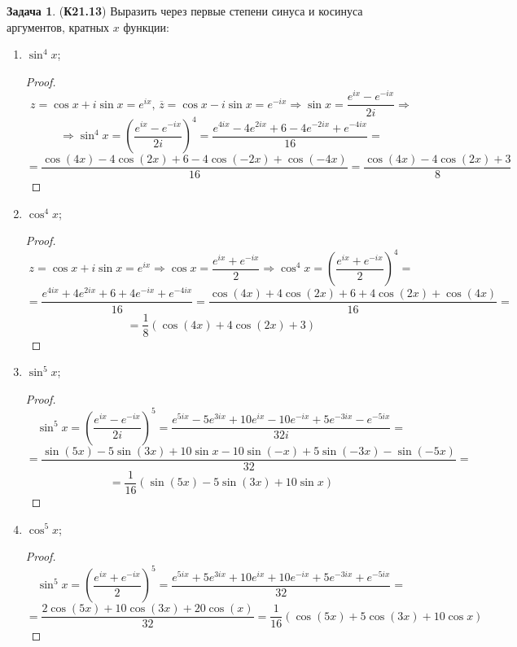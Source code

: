 \documentclass[12pt]{article}
\theoremstyle{definition}
\newtheorem{problem}{Задача}
\newcommand{\ovl}[1]{\overline{#1}}
\begin{document}
\begin{problem}(\textbf{К21.13})
	Выразить через первые степени синуса и косинуса аргументов, кратных $x$ функции:
	\begin{enumerate}[label=\asbuk*)]
		\item $\sin^4{x}$;
		\begin{proof}
			$$
				z = \cos x + i \sin x = e^{ix}, \, \ovl{z} = \cos x - i \sin x = e^{-ix} \Rightarrow \sin x = \dfrac{e^{ix} - e^{-ix}}{2i} \Rightarrow 
			$$	
			$$	
				\Rightarrow \sin^4x = \left(\dfrac{e^{ix} - e^{-ix}}{2i}\right)^4 = \dfrac{e^{4ix} - 4e^{2ix} + 6 - 4e^{-2ix} +  e^{-4ix}}{16} = 
			$$
			$$
				= \dfrac{\cos(4x) - 4\cos(2x) + 6 - 4\cos(-2x) + \cos(-4x)}{16} = \dfrac{\cos(4x) - 4\cos(2x) + 3}{8}
			$$
		\end{proof}
		\item $\cos^4x$;
		\begin{proof}
			$$
				z = \cos x + i\sin x = e^{ix} \Rightarrow \cos{x} = \dfrac{e^{ix} + e^{-ix}}{2} \Rightarrow \cos^4x = \left(\dfrac{e^{ix} + e^{-ix}}{2}\right)^4 = 
			$$
			$$
				= \dfrac{e^{4ix} + 4e^{2ix} + 6 + 4e^{-ix} + e^{-4ix}}{16} = \dfrac{\cos(4x) + 4\cos(2x) + 6 + 4\cos(2x) + \cos(4x)}{16} = 
			$$
			$$
				= \dfrac{1}{8}\left(\cos(4x) + 4\cos(2x) +  3\right)
			$$
		\end{proof}
		\item $\sin^5{x}$;
		\begin{proof}
			$$
				\sin^5{x} = \left(\dfrac{e^{ix} - e^{-ix}}{2i}\right)^5 = \dfrac{e^{5ix} - 5e^{3ix} + 10e^{ix} - 10e^{-ix} + 5e^{-3ix} -e^{-5ix}}{32i} = 
			$$
			$$
				= \dfrac{\sin(5x) - 5\sin(3x) + 10\sin x - 10 \sin(-x) + 5 \sin(-3x) - \sin(-5x)}{32} = 
			$$
			$$
				= \dfrac{1}{16}\left(\sin(5x) - 5\sin(3x) + 10\sin x\right)
			$$
		\end{proof}
		\item $\cos^5{x}$;
		\begin{proof}
			$$
				\sin^5{x} = \left(\dfrac{e^{ix} + e^{-ix}}{2}\right)^5 = \dfrac{e^{5ix} + 5e^{3ix} + 10e^{ix} + 10e^{-ix} + 5e^{-3ix} +e^{-5ix}}{32} =
			$$
			$$
				=	\dfrac{2\cos(5x) + 10\cos(3x) + 20\cos(x)}{32} = \dfrac{1}{16}(\cos(5x) + 5\cos(3x) + 10\cos x)
			$$
		\end{proof}
	\end{enumerate}
\end{problem}
\end{document}
